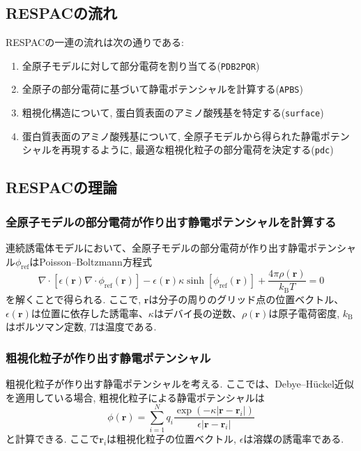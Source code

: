 \subsection{RESPACの流れ}
RESPACの一連の流れは次の通りである:
\begin{enumerate}
    \item 全原子モデルに対して部分電荷を割り当てる(\texttt{PDB2PQR})
    \item 全原子の部分電荷に基づいて静電ポテンシャルを計算する(\texttt{APBS})
    \item 粗視化構造について, 蛋白質表面のアミノ酸残基を特定する(\texttt{surface})
    \item 蛋白質表面のアミノ酸残基について, 全原子モデルから得られた静電ポテンシャルを再現するように, 最適な粗視化粒子の部分電荷を決定する(\texttt{pdc})
\end{enumerate}

\subsection{RESPACの理論}
\subsubsection{全原子モデルの部分電荷が作り出す静電ポテンシャルを計算する}
連続誘電体モデルにおいて、全原子モデルの部分電荷が作り出す静電ポテンシャル$\phi_{\mathrm{ref}}$はPoisson–Boltzmann方程式
\begin{equation}
    \nabla \cdot
    \left[
        \epsilon(\bm{r}) \nabla \cdot \phi_{\mathrm{ref}}(\bm{r})
    \right]
    -
    \epsilon(\bm{r}) \kappa \sinh[\phi_{\mathrm{ref}}(\bm{r})]
    +
    \frac{4 \pi \rho(\bm{r})}{k_{\mathrm{B}}T}
    =
    0
\end{equation}
を解くことで得られる.
ここで, $\bm{r}$は分子の周りのグリッド点の位置ベクトル、$\epsilon(\bm{r})$は位置に依存した誘電率、$\kappa$はデバイ長の逆数、$\rho(\bm{r})$は原子電荷密度, $k_{\mathrm{B}}$はボルツマン定数,
$T$は温度である.

\subsubsection{粗視化粒子が作り出す静電ポテンシャル}
粗視化粒子が作り出す静電ポテンシャルを考える. ここでは、Debye--H\"{u}ckel近似を適用している場合,
粗視化粒子による静電ポテンシャルは
\begin{equation}
    \phi(\bm{r})
    =
    \sum_{i=1}^{N}
    q_{i}
    \frac{\exp(-\kappa |\bm{r} - \bm{r}_{i}|)}{\epsilon |\bm{r} - \bm{r}_{i}|}
\end{equation}
と計算できる.
ここで$\bm{r}_{i}$は粗視化粒子の位置ベクトル, $\epsilon$は溶媒の誘電率である.


